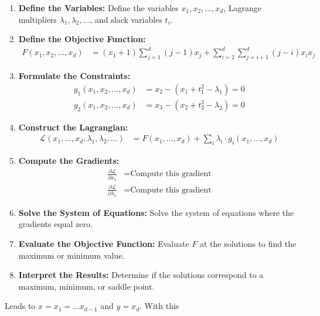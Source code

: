 \documentclass[11pt]{article}
\begin{document}
\begin{enumerate}
    \item \textbf{Define the Variables:} 
    Define the variables \( x_1, x_2, \dots, x_d \), Lagrange multipliers \( \lambda_1, \lambda_2, \dots \), and slack variables \( t_i \).

    \item \textbf{Define the Objective Function:}
    \begin{align*}
    F(x_1, x_2, \dots, x_d) &= (x_1 + 1) \sum_{j=1}^{d} (j-1)x_j + \sum_{i=2}^{d} \sum_{j=i+1}^{d} (j-i) x_i x_j
    \end{align*}

    \item \textbf{Formulate the Constraints:}
    \begin{align*}
    g_1(x_1, x_2, \dots, x_d) &= x_2 - (x_1 + t_1^2 - \lambda_1) = 0 \\
    g_2(x_1, x_2, \dots, x_d) &= x_3 - (x_2 + t_2^2 - \lambda_2) = 0
    \end{align*}

    \item \textbf{Construct the Lagrangian:}
    \begin{align*}
    \mathcal{L}(x_1, \dots, x_d, \lambda_1, \lambda_2, \dots) &= F(x_1, \dots, x_d) + \sum_{i} \lambda_i \cdot g_i(x_1, \dots, x_d)
    \end{align*}

    \item \textbf{Compute the Gradients:}
    \begin{align*}
    \frac{\partial \mathcal{L}}{\partial x_1} &= \text{Compute this gradient} \\
    \frac{\partial \mathcal{L}}{\partial \lambda_1} &= \text{Compute this gradient}
    \end{align*}

    \item \textbf{Solve the System of Equations:}
    Solve the system of equations where the gradients equal zero.

    \item \textbf{Evaluate the Objective Function:}
    Evaluate \( F \) at the solutions to find the maximum or minimum value.

    \item \textbf{Interpret the Results:}
    Determine if the solutions correspond to a maximum, minimum, or saddle point.
\end{enumerate}

\newpage
Leads to \(x = x_1 = \dots x_{d-1}\) and \(y = x_d\). With this
\end{document}
